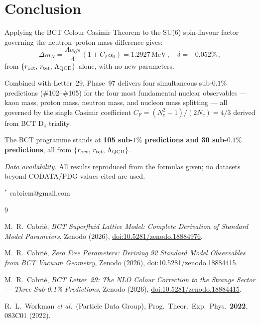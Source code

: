 \documentclass[twocolumn,10pt,a4paper]{article}
\begin{document}
\section{Conclusion}

Applying the BCT Colour Casimir Theorem to the SU(6) spin-flavour factor
governing the neutron--proton mass difference gives:
\[
  \Delta m_N = \frac{\Lambda\alpha_0\pi}{4}(1+C_F\alpha_0)
             = 1.2927\,\mathrm{MeV}\,,\quad\delta=-0.052\%\,,
\]
from $\{r_{\rm oct},\,r_{\rm tet},\,\Lambda_{\rm QCD}\}$ alone, with no new
parameters.

Combined with Letter~29, Phase~97 delivers four simultaneous sub-$0.1\%$
predictions (\#102--\#105) for the four most fundamental nuclear observables
--- kaon mass, proton mass, neutron mass, and nucleon mass splitting --- all
governed by the single Casimir coefficient $C_F = (N_c^2-1)/(2N_c) = 4/3$
derived from BCT D$_4$ triality.

The BCT programme stands at \textbf{105 sub-$1\%$ predictions and 30
sub-$0.1\%$ predictions}, all from $\{r_{\rm oct},\,r_{\rm tet},\,\Lambda_{\rm QCD}\}$.

\bigskip
\noindent\textit{Data availability.}
All results reproduced from the formulas given; no datasets beyond
CODATA/PDG values cited are used.

\bigskip
\noindent$^\ast$ cabriem@gmail.com

\begin{thebibliography}{9}

M.~R.\ Cabri\'e,
\textit{BCT Superfluid Lattice Model: Complete Derivation of Standard Model
Parameters},
Zenodo (2026), \href{https://doi.org/10.5281/zenodo.18884976}{doi:10.5281/zenodo.18884976}.

M.~R.\ Cabri\'e,
\textit{Zero Free Parameters: Deriving 92 Standard Model Observables from
BCT Vacuum Geometry},
Zenodo (2026), \href{https://doi.org/10.5281/zenodo.18884415}{doi:10.5281/zenodo.18884415}.

M.~R.\ Cabri\'e,
\textit{BCT Letter~29: The NLO Colour Correction to the Strange Sector ---
Three Sub-0.1\% Predictions},
Zenodo (2026), \href{https://doi.org/10.5281/zenodo.18884415}{doi:10.5281/zenodo.18884415}.

R.~L.\ Workman \textit{et al.}\ (Particle Data Group),
Prog.\ Theor.\ Exp.\ Phys.\ \textbf{2022}, 083C01 (2022).

\end{thebibliography}
\end{document}
